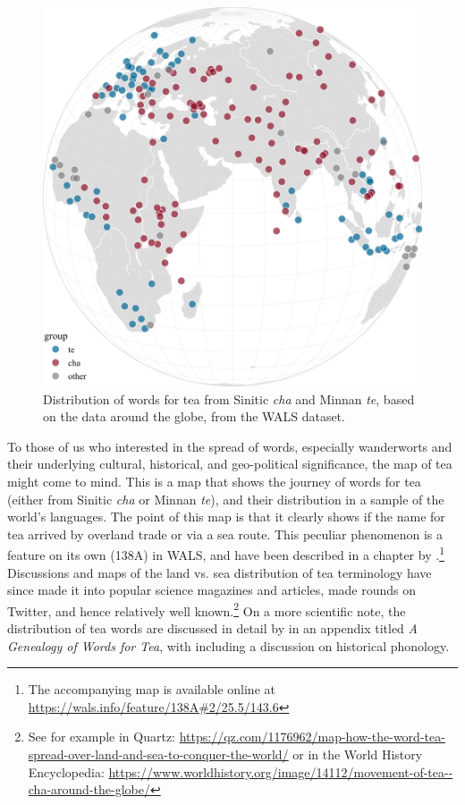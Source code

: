 \begin{figure}[ht!]
    \centering
    \includegraphics[width=\linewidth]{imgs/plots/distribution_tea.pdf}
    \caption[Distribution of words for tea from Sinitic \textit{cha} and Minnan \textit{te}.]{Distribution of words for tea from Sinitic \textit{cha} and Minnan \textit{te}, based on the data around the globe, from the \gls{WALS} dataset.}
    \label{fig:distribution_tea}
\end{figure}

To those of us who interested in the spread of words, especially \glspl{wanderwort} and their underlying cultural, historical, and geo-political significance, the map of tea might come to mind. This is a map that shows the journey of words for tea (either from Sinitic \textit{cha} or Minnan \textit{te}), and their distribution in a sample of the world's languages. The point of this map is that it clearly shows if the name for tea arrived by overland trade or via a sea route. This peculiar phenomenon is a feature on its own (138A) in \gls{WALS}, and have been described in a chapter by \textcite{dahl_tea_2013}.\footnote{The accompanying map is available online at \url{https://wals.info/feature/138A\#2/25.5/143.6}} Discussions and maps of the land vs. sea distribution of tea terminology have since made it into popular science magazines and articles, made rounds on Twitter, and hence relatively well known.\footnote{See for example \textcite{sonnad_tea_2018} in Quartz: \url{https://qz.com/1176962/map-how-the-word-tea-spread-over-land-and-sea-to-conquer-the-world/} or \textcite{netchev_movement_2022} in the World History Encyclopedia: \url{https://www.worldhistory.org/image/14112/movement-of-tea--cha-around-the-globe/}} On a more scientific note, the distribution of tea words are discussed in detail by \autocite[261-270]{mair_true_2009} in an appendix titled \textit{A Genealogy of Words for Tea}, with including a discussion on historical phonology.

